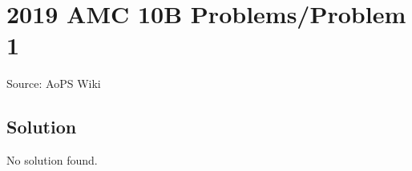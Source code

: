 \documentclass[12pt]{article}
\begin{document}
\section*{{2019 AMC 10B Problems/Problem 1}}
Source: AoPS Wiki

\subsection*{Solution}
No solution found.
\end{document}
